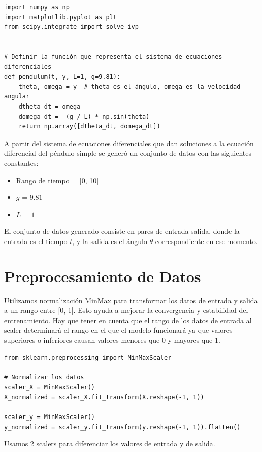 \documentclass[a4paper,12pt]{article}
\begin{document}
\begin{verbatim}
import numpy as np
import matplotlib.pyplot as plt
from scipy.integrate import solve_ivp


# Definir la función que representa el sistema de ecuaciones diferenciales
def pendulum(t, y, L=1, g=9.81):
    theta, omega = y  # theta es el ángulo, omega es la velocidad angular
    dtheta_dt = omega
    domega_dt = -(g / L) * np.sin(theta)
    return np.array([dtheta_dt, domega_dt])
\end{verbatim}

A partir del sistema de ecuaciones diferenciales que dan soluciones a la ecuación diferencial del péndulo simple se generó un conjunto de datos con las siguientes constantes:
\begin{itemize}
    \item Rango de tiempo = [0, 10]
    \item \(g\) = \(9.81\)
    \item \(L\) = \(1\)
\end{itemize}

El conjunto de datos generado consiste en pares de entrada-salida, donde la entrada es el tiempo \(t\), y la salida es el ángulo \(\theta\) correspondiente en ese momento.

\section{Preprocesamiento de Datos}
Utilizamos normalización MinMax para transformar los datos de entrada y salida a un rango entre [0, 1]. Esto ayuda a mejorar la convergencia y estabilidad del entrenamiento. Hay que tener en cuenta que el rango de los datos de entrada al scaler determinará el rango en el que el modelo funcionará ya que valores superiores o inferiores causan valores menores que 0 y mayores que 1.

\begin{verbatim}
from sklearn.preprocessing import MinMaxScaler

# Normalizar los datos
scaler_X = MinMaxScaler()
X_normalized = scaler_X.fit_transform(X.reshape(-1, 1))

scaler_y = MinMaxScaler()
y_normalized = scaler_y.fit_transform(y.reshape(-1, 1)).flatten()
\end{verbatim}

Usamos 2 scalers para diferenciar los valores de entrada y de salida.
\end{document}
